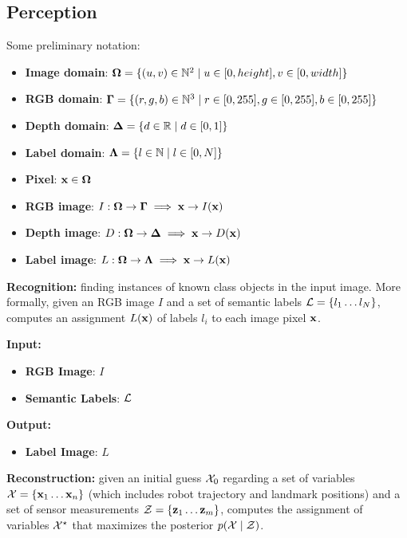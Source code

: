 \documentclass{article}
\begin{document}
	\subsection{Perception}

	Some preliminary notation:
	
	\begin{itemize}
		\item {\bf Image domain}: $\mathbf{\Omega} = \{(u,v) \in \mathbb{N}^2 \mid u \in [0,height], v \in [0,width]\}$
		\item {\bf RGB domain}: $\mathbf{\Gamma} = \{(r,g,b) \in \mathbb{N}^3 \mid r \in [0,255], g \in [0,255], b \in [0,255]\}$
		\item {\bf Depth domain}: $\mathbf{\Delta} = \{ d \in \mathbb{R} \mid d \in [0,1]\}$
		\item {\bf Label domain}: $\mathbf{\Lambda} = \{ l \in \mathbb{N} \mid l \in [0,N]\}$
		\item {\bf Pixel}: $\mathbf{x} \in \mathbf{\Omega}$
		\item {\bf RGB image}: $I : \mathbf{\Omega} \rightarrow \mathbf{\Gamma} \implies \mathbf{x} \rightarrow I(\mathbf{x})$
		\item {\bf Depth image}: $D : \mathbf{\Omega} \rightarrow \mathbf{\Delta} \implies \mathbf{x} \rightarrow D(\mathbf{x})$
		\item {\bf Label image}: $L : \mathbf{\Omega} \rightarrow \mathbf{\Lambda} \implies \mathbf{x} \rightarrow L(\mathbf{x})$
	\end{itemize}
	
	\noindent
	{\bf Recognition:} 
	finding instances of known class objects in the input image. More formally, given an RGB image $I$ and a set of semantic labels $\mathcal{L} = \{ l_1 \dots l_N \}$, computes an assignment $L(\mathbf{x})$ of labels $l_i$ to each image pixel $\mathbf{x}$.
	
	\noindent
	{\bf Input: }
	\begin{itemize}
		\item {\bf RGB Image}: $I$
		\item {\bf Semantic Labels}: $\mathcal{L}$
	\end{itemize}
	\noindent
	{\bf Output: }
	\begin{itemize}
		\item {\bf Label Image}: $L$
	\end{itemize}
	
	\noindent
	{\bf Reconstruction:} 
	given an initial guess $\mathcal{X}_0$ regarding a set of variables $\mathcal{X} = \{\mathbf{x}_1 \dots \mathbf{x}_n\}$ (which includes robot trajectory and landmark positions) and a set of sensor measurements $\mathcal{Z} = \{\mathbf{z}_1 \dots \mathbf{z}_m\}$, computes the assignment of variables $\mathcal{X}^\star$ that maximizes the posterior $p(\mathcal{X} \mid \mathcal{Z})$.
	
\end{document}
